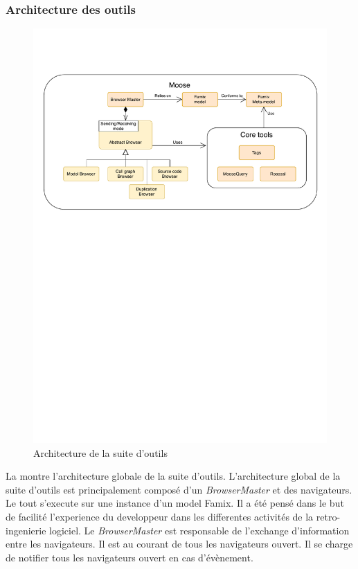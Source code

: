 \documentclass[a4paper]{article}
\newcommand{\browserMaster}{\textit{BrowserMaster} \xspace}
\begin{document}
\subsubsection{Architecture des outils }
\begin{figure}[htbp]
  \begin{center}
  \includegraphics[width=1\linewidth]{./figures/architecture.pdf}
  \caption{Architecture de la suite d'outils}
  \label{fig:applicationArchitecture}
  \end{center}
  \vspace{-0.3cm}
\end{figure}

La  montre l'architecture globale de la suite d'outils.
L'architecture global  de la suite d'outils est principalement composé d'un \browserMaster et des navigateurs.
Le tout s'execute sur une instance d'un model Famix. 
Il a été pensé dans le but de facilité l'experience du developpeur dans les differentes activités de la retro-ingenierie logiciel.
Le \browserMaster est responsable de l'exchange d'information entre les navigateurs.
Il est au courant de tous les navigateurs ouvert. 
Il se charge de notifier tous les navigateurs ouvert en cas d'évènement.
\end{document}
